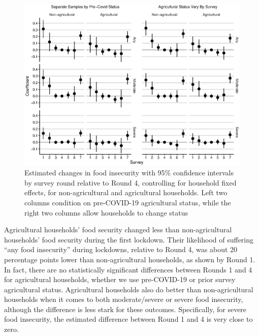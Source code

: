 \documentclass{wber}
\begin{document}
\begin{figure}
\caption{Estimated changes in food insecurity with 95\% confidence
intervals by survey round relative to Round 4, controlling for household
fixed effects, for non-agricultural and agricultural households. Left
two columns condition on pre-COVID-19 agricultural status, while the
right two columns allow households to change
status}\label{fig:ag_vs_non_ag}
\begin{center}
\includegraphics[width=\linewidth, keepaspectratio]{./eps/fig_12.eps}
\end{center}
\end{figure}


Agricultural households' food security changed less than
non-agricultural households' food security during the first lockdown.
Their likelihood of suffering ``any food insecurity'' during lockdowns,
relative to Round 4, was about 20 percentage points lower than
non-agricultural households, as shown by Round 1. In fact, there are no
statistically significant differences between Rounds 1 and 4 for
agricultural households, whether we use pre-COVID-19 or prior survey
agricultural status. Agricultural households also do better than
non-agricultural households when it comes to both moderate/severe or
severe food insecurity, although the difference is less stark for these
outcomes. Specifically, for severe food insecurity, the estimated
difference between Round 1 and 4 is very close to zero.
\end{document}
